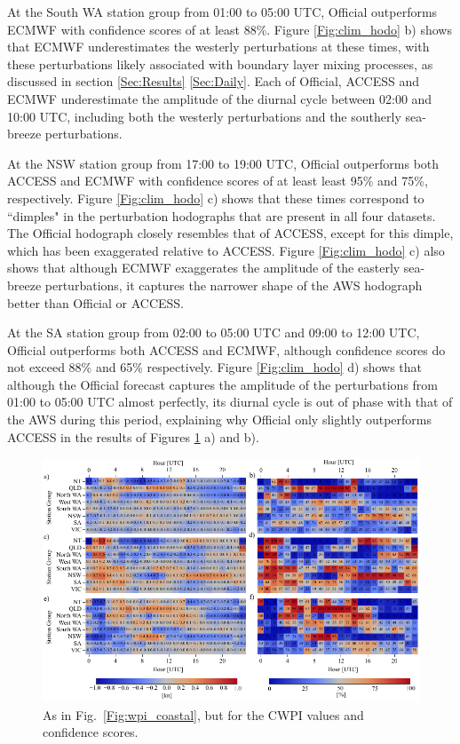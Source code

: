 \documentclass[twocol]{ametsoc}
\begin{document}
At the South WA station group from 01:00 to 05:00 UTC, Official outperforms ECMWF with confidence scores of at least $88\%$. Figure \ref{Fig:clim_hodo} b) shows that ECMWF underestimates the westerly perturbations at these times, with these perturbations likely associated with boundary layer mixing processes, as discussed in section \ref{Sec:Results} \ref{Sec:Daily}. Each of Official, ACCESS and ECMWF underestimate the amplitude of the diurnal cycle between 02:00 and 10:00 UTC, including both the westerly perturbations and the southerly sea-breeze perturbations. 

At the NSW station group from 17:00 to 19:00 UTC, Official outperforms both ACCESS and ECMWF with confidence scores of at least least 95\% and 75\%, respectively. Figure \ref{Fig:clim_hodo} c) shows that these times correspond to ``dimples" in the perturbation hodographs that are present in all four datasets. The Official hodograph closely resembles that of ACCESS, except for this dimple, which has been exaggerated relative to ACCESS. Figure \ref{Fig:clim_hodo} c) also shows that although ECMWF exaggerates the amplitude of the easterly sea-breeze perturbations, it captures the narrower shape of the AWS hodograph better than Official or ACCESS.

At the SA station group from 02:00 to 05:00 UTC and 09:00 to 12:00 UTC, Official outperforms both ACCESS and ECMWF, although confidence scores do not exceed 88\% and 65\% respectively. Figure \ref{Fig:clim_hodo} d) shows that although the Official forecast captures the amplitude of the perturbations from 01:00 to 05:00 UTC almost perfectly, its diurnal cycle is out of phase with that of the AWS during this period, explaining why Official only slightly outperforms ACCESS in the results of Figures \ref{Fig:cwpi_coastal} a) and b).

\begin{figure}
\centering
\includegraphics[width=39pc]{cwpi_coastal.pdf}
\caption{As in Fig.~\ref{Fig:wpi_coastal}, but for the CWPI values and confidence scores.}
\label{Fig:cwpi_coastal}
\end{figure}
\end{document}
